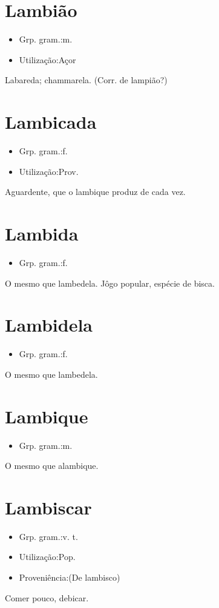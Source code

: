 \section{Lambião}
\begin{itemize}
\item {Grp. gram.:m.}
\end{itemize}
\begin{itemize}
\item {Utilização:Açor}
\end{itemize}
Labareda; chammarela.
(Corr. de \textunderscore lampião\textunderscore ?)
\section{Lambicada}
\begin{itemize}
\item {Grp. gram.:f.}
\end{itemize}
\begin{itemize}
\item {Utilização:Prov.}
\end{itemize}
Aguardente, que o lambique produz de cada vez.
\section{Lambida}
\begin{itemize}
\item {Grp. gram.:f.}
\end{itemize}
O mesmo que \textunderscore lambedela\textunderscore .
Jôgo popular, espécie de bisca.
\section{Lambidela}
\begin{itemize}
\item {Grp. gram.:f.}
\end{itemize}
O mesmo que \textunderscore lambedela\textunderscore .
\section{Lambique}
\begin{itemize}
\item {Grp. gram.:m.}
\end{itemize}
O mesmo que \textunderscore alambique\textunderscore .
\section{Lambiscar}
\begin{itemize}
\item {Grp. gram.:v. t.}
\end{itemize}
\begin{itemize}
\item {Utilização:Pop.}
\end{itemize}
\begin{itemize}
\item {Proveniência:(De \textunderscore lambisco\textunderscore )}
\end{itemize}
Comer pouco, debicar.
